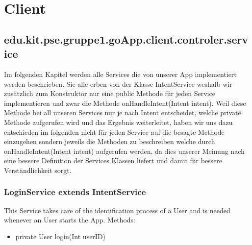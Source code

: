 
\section{Client} 
	\subsection{edu.kit.pse.gruppe1.goApp.client.controler.service}
	Im folgenden Kapitel werden alle Services die von unserer App implementiert werden beschrieben.
	Sie alle erben von der Klasse IntentService weshalb wir zusätzlich zum Konstruktor nur eine public Methode für jeden Service implementieren und zwar die Methode onHandleIntent(Intent intent).
	Weil diese Methode bei all unseren Services nur je nach Intent entscheidet, welche private Methode aufgerufen wird und das Ergebnis weiterleitet, haben wir uns dazu entschieden im folgenden nicht für jeden Service auf die besagte Methode einzugehen sondern jeweils die Methoden zu beschreiben welche durch onHandleIntent(Intent intent) aufgerufen werden, da dies unserer Meinung nach eine bessere Definition der Services Klassen liefert und damit für bessere Verständlichkeit sorgt. 
	
	\subsubsection {LoginService extends IntentService}
		This Service takes care of the identification process of a User and is needed whenever an User starts the App.
	\newline Methods:
	\begin{itemize}
	\item private User login(Int userID)
	\end{itemize}
	
